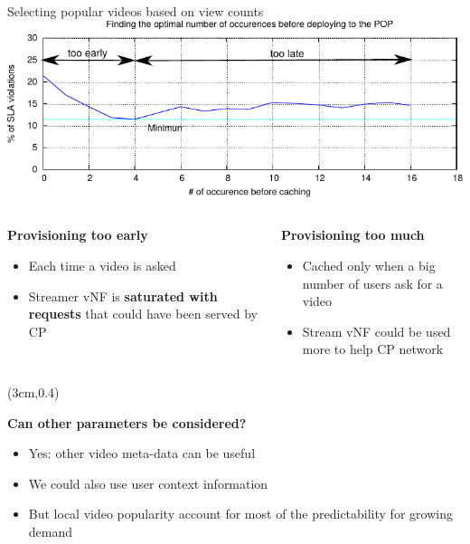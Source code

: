 \documentclass[a4paper]{beamer}
\begin{document}
\begin{frame}{Selecting popular videos based on view counts}
	\includegraphics[width=0.90\linewidth]{cachingStrat_evaluation.pdf}
		\begin{columns}[T]
		\begin{column}[T]{0.5 \textwidth} 
		
		\textbf{Provisioning too early}
			\begin{itemize}
				\item Each time a video is asked
				\item Streamer vNF is \textbf{saturated with requests} that could have been served by CP
			\end{itemize}
		\end{column}
										
		\begin{column}[T]{0.5\textwidth} 
										  
			\textbf{Provisioning too much}
			\begin{itemize}
				\item Cached only when a big number of users ask for a video
				\item Stream vNF could be used more to help CP network
			\end{itemize}
			
		\end{column}
																										
	\end{columns}
	
			\begin{textblock*}{8cm}(3cm,0.4\textheight)
		\begin{alertblock}{}
			\textbf{ Can other parameters be considered? }
			\begin{itemize}
				\item Yes: other video meta-data can be useful
				\item We could also use user context information
				\item But local video popularity account for most of the predictability for growing demand
			\end{itemize}
		\end{alertblock}
	\end{textblock*}		
\end{frame}
\end{document}
